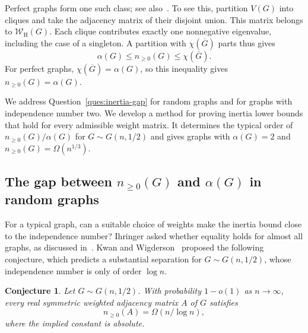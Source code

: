 \documentclass[11pt]{article}
\numberwithin{equation}{section}
\newtheorem{conjecture}[theorem]{Conjecture}
\theoremstyle{definition}
\theoremstyle{remark}
\newcommand{\W}{\mathcal W_{\mathrm H}}
\begin{document}
Perfect graphs form one such class; see also~\cite[Section~1]{Sinkovic}.
To see this, partition $V(G)$ into cliques and take the adjacency
matrix of their disjoint union. This matrix belongs to $\W(G)$.
Each clique contributes exactly one nonnegative eigenvalue, including
the case of a singleton. A partition with $\chi(\overline G)$ parts thus gives
\begin{equation}\label{eq:inertia-clique-cover}
 \alpha(G)\leq n_{\geq0}(G)\leq\chi(\overline G).
\end{equation}
For perfect graphs, $\chi(\overline G)=\alpha(G)$, so this inequality
gives $n_{\geq0}(G)=\alpha(G)$.

We address Question~\ref{ques:inertia-gap} for random graphs and
for graphs with independence number two. We develop a method for
proving inertia lower bounds that hold for every admissible weight
matrix. It determines the typical order of
$n_{\geq0}(G)/\alpha(G)$ for $G\sim G(n,1/2)$ and gives graphs with
$\alpha(G)=2$ and $n_{\geq0}(G)=\Omega(n^{1/3})$.

\subsection{The gap between \texorpdfstring{$n_{\geq0}(G)$}{n>=0(G)} and \texorpdfstring{$\alpha(G)$}{alpha(G)} in random graphs}

For a typical graph, can a suitable choice of weights make the
inertia bound close to the independence number? Ihringer asked
whether equality holds for almost all graphs, as discussed
in~\cite[Section~4]{KW}. Kwan and
Wigderson~\cite[Conjecture~4.1]{KW} proposed the following conjecture,
which predicts a substantial separation for $G\sim G(n,1/2)$, whose
independence number is only of order $\log n$.
\begin{conjecture}
\label{conj:KW}
Let $G\sim G(n,1/2)$. With probability $1-o(1)$ as $n\to\infty$,
every real symmetric weighted adjacency matrix $A$ of $G$ satisfies
\begin{equation}\label{eq:KW-conjecture}
 n_{\geq0}(A)=\Omega(n/\log n),
\end{equation}
where the implied constant is absolute.
\end{conjecture}
\end{document}
